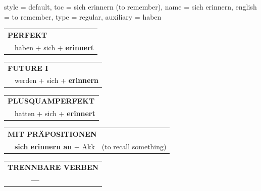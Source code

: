 \begin{verbentry}{
  style = {default},
  toc = {sich erinnern (to remember)},
  name = {sich erinnern},
  english = {to remember},
  type = {regular},
  auxiliary = {haben}
}
 \begin{tabular}{rl}
     \multicolumn{2}{l}{\textbf{PERFEKT}}\\
    &haben + sich + \textbf{erinnert}\\
  \end{tabular}
\hfill
   \begin{tabular}{rl}
   
    \multicolumn{2}{l}{\textbf{FUTURE I} }\\
    &werden + sich + \textbf{erinnern}\\
 
  \end{tabular}
\hfill
   \begin{tabular}{rl}
      \multicolumn{2}{l}{\textbf{PLUSQUAMPERFEKT}}\\
    &hatten + sich + \textbf{erinnert}\\
  \end{tabular}
  
\vspace{10pt}

   \begin{tabular}{lll}
      \multicolumn{3}{l}{\textbf{MIT PRÄPOSITIONEN}}\\
& \textbf{sich erinnern an} + Akk & (to recall something)
  \end{tabular}
  \hfill
   \begin{tabular}{lll}
\multicolumn{3}{l}{\textbf{TRENNBARE VERBEN}}\\
& \textbf{---} & \\
\end{tabular}
  
  \vspace{-5pt}
\end{verbentry}

